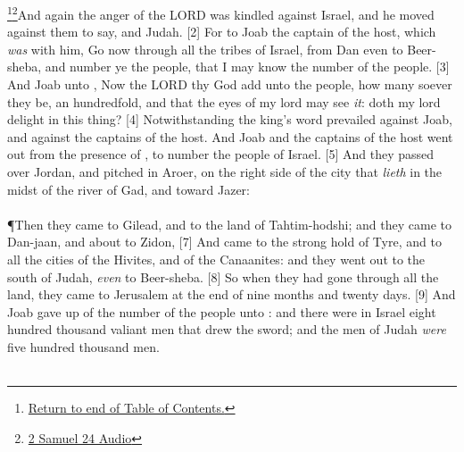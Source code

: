 \footnote{\textcolor[cmyk]{0.99998,1,0,0}{\hyperlink{TOC}{Return to end of Table of Contents.}}}\footnote{\href{https://audiobible.com/bible/2_samuel_24.html}{\textcolor[cmyk]{0.99998,1,0,0}{2 Samuel 24 Audio}}}\textcolor[cmyk]{0.99998,1,0,0}{And again the anger of the LORD was kindled against Israel, and he moved   against them to say,  and Judah.}
[2] \textcolor[cmyk]{0.99998,1,0,0}{For     to Joab the captain of the host, which \emph{was} with him, Go now through all the tribes of Israel, from Dan even to Beer-sheba, and number ye the people, that I may know the number of the people.}
[3] \textcolor[cmyk]{0.99998,1,0,0}{And Joab   unto  , Now the LORD thy God add unto the people, how many soever they be, an hundredfold, and that the eyes of my lord   may see \emph{it}:  doth my lord   delight in this thing?}
[4] \textcolor[cmyk]{0.99998,1,0,0}{Notwithstanding the king's word prevailed against Joab, and against the captains of the host. And Joab and the captains of the host went out from the presence of  , to number the people of Israel.}
[5] \textcolor[cmyk]{0.99998,1,0,0}{And they passed over Jordan, and pitched in Aroer, on the right side of the city that \emph{lieth} in the midst of the river of Gad, and toward Jazer:}\\
\\
\P \textcolor[cmyk]{0.99998,1,0,0}{Then they came to Gilead, and to the land of Tahtim-hodshi; and they came to Dan-jaan, and about to Zidon,}
[7] \textcolor[cmyk]{0.99998,1,0,0}{And came to the strong hold of Tyre, and to all the cities of the Hivites, and of the Canaanites: and they went out to the south of Judah, \emph{even} to Beer-sheba.}
[8] \textcolor[cmyk]{0.99998,1,0,0}{So when they had gone through all the land, they came to Jerusalem at the end of nine months and twenty days.}
[9] \textcolor[cmyk]{0.99998,1,0,0}{And Joab gave up  of the number of the people unto  : and there were in Israel eight hundred thousand valiant men that drew the sword; and the men of Judah \emph{were} five hundred thousand men.}\marginpar{\scriptsize \textcolor[rgb]{0.00,0.545,0.269}{$\rightarrow$800,000 + 500,000 = 1,300,000. }}\\
\\
